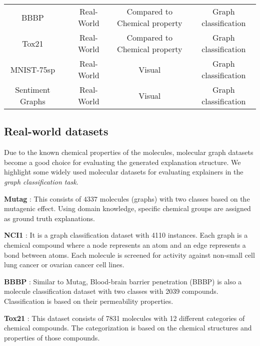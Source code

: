 \begin{table}[tb]
\begin{tabular}{ccccc}
        BBBP & \cite{protgnn,cf^2-counter, moleculenet} & Real-World & Compared to Chemical property  & Graph classification \\  
        Tox21 & \cite{meg-counter, moleculenet} & Real-World & Compared to Chemical property  & Graph classification \\  
        MNIST-75sp & \cite{pgm-ex,GSAT,mnist_75}& Real-World & Visual  & Graph classification \\  
        Sentiment Graphs & \cite{subgraphX,GSAT,protgnn,sst-datasets} & Real-World & Visual  & Graph classification \\  \bottomrule

        
    \end{tabular}%
    \vspace{-2mm}  \label{tab::dataset}%
\end{table}%

\subsection{Real-world datasets}
Due to the known chemical properties of the molecules, molecular graph datasets become a good choice for evaluating the generated explanation structure. 
We highlight some widely used molecular datasets for evaluating explainers in the \textit{graph classification task}. 

\noindent\textbf{Mutag} \cite{mutag}: This consists of $4337$ molecules (graphs) with two classes based on the mutagenic effect. Using domain knowledge, specific chemical groups are assigned as ground truth explanations.    
    
\noindent\textbf{NCI1} \cite{NCI1_data}: It is a graph classification dataset with 4110 instances. Each graph is a chemical compound where a node represents an atom and an edge represents a bond between atoms. Each molecule is screened for activity against non-small cell lung cancer or ovarian cancer cell lines.

\noindent\textbf{BBBP} \cite{moleculenet}: Similar to Mutag, Blood-brain barrier penetration (BBBP) is also a molecule classification dataset with two classes with 2039 compounds. Classification is based on their permeability properties.

\noindent\textbf{Tox21} \cite{moleculenet}: This dataset consists of 7831 molecules with 12 different categories of chemical compounds. The categorization is based on the chemical structures and properties of those compounds. 
    
